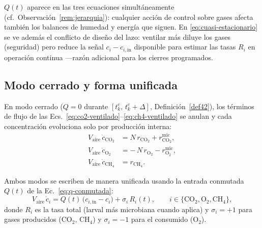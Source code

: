 \begin{remark}\label{rem:q-compartida}
$Q(t)$ aparece en las tres ecuaciones simultáneamente
(cf.~Observación~\ref{rem:jerarquia}): cualquier acción de control sobre
gases afecta también los balances de humedad y energía que siguen. En
\eqref{eq:cuasi-estacionario} se ve además el conflicto de diseño del lazo:
ventilar más diluye los gases (seguridad) pero reduce la señal $c_i -
c_{i,\mathrm{in}}$ disponible para estimar las tasas $R_i$ en operación
continua ---razón adicional para los cierres programados.
\end{remark}

\subsection{Modo cerrado y forma unificada}
\label{sec:modo-cerrado}

En modo cerrado ($Q = 0$ durante $[t_k^{c},\, t_k^{c}+\Delta]$,
Definición~\ref{def42}), los términos de flujo de las
Ecs.~\eqref{eq:co2-ventilado}--\eqref{eq:ch4-ventilado} se anulan y cada
concentración evoluciona solo por producción interna:
\begin{align}
V_{\mathrm{aire}}\,\dot{c}_{\mathrm{CO_2}} &=
N\,r_{\mathrm{CO_2}} + r_{\mathrm{CO_2}}^{\mathrm{mic}},
\label{eq:co2-cerrado}\\
V_{\mathrm{aire}}\,\dot{c}_{\mathrm{O_2}} &=
-\,N\,r_{\mathrm{O_2}} - r_{\mathrm{O_2}}^{\mathrm{mic}},
\label{eq:o2-cerrado}\\
V_{\mathrm{aire}}\,\dot{c}_{\mathrm{CH_4}} &= r_{\mathrm{CH_4}}.
\label{eq:ch4-cerrado}
\end{align}

Ambos modos se escriben de manera unificada usando la entrada conmutada
$Q(t)$ de la Ec.~\eqref{eq:q-conmutada}:
\begin{equation}
V_{\mathrm{aire}}\,\dot{c}_i =
Q(t)\,\bigl(c_{i,\mathrm{in}} - c_i\bigr) + \sigma_i\,R_i(t),
\qquad i \in \{\mathrm{CO_2}, \mathrm{O_2}, \mathrm{CH_4}\},
\label{eq:gas-unificado}
\end{equation}
donde $R_i$ es la tasa total (larval más microbiana cuando aplica) y
$\sigma_i = +1$ para gases producidos ($\mathrm{CO_2}$, $\mathrm{CH_4}$) y
$\sigma_i = -1$ para el consumido ($\mathrm{O_2}$).

